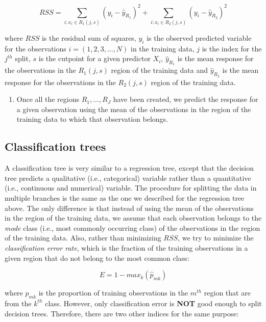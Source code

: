 \documentclass[
]{book}
\providecommand{\tightlist}{%
  \setlength{\itemsep}{0pt}\setlength{\parskip}{0pt}}
\begin{document}
\[
RSS=\sum_{i: x_i \in R_1(j,s)}(y_i-\hat{y}_{R_1})^2 + \sum_{i: x_i \in R_2(j,s)}(y_i-\hat{y}_{R_2})^2
\]

where \(RSS\) is the residual sum of squares, \(y_i\) is the observed predicted variable for the observations \(i=(1,2,3, \dots, N)\) in the training data, \(j\) is the index for the \(j^{th}\) split, \(s\) is the cutpoint for a given predictor \(X_i\), \(\hat{y}_{R_1}\) is the mean response for the observations in the \(R_1(j,s)\) region of the training data and \(\hat{y}_{R_2}\) is the mean response for the observations in the \(R_2(j,s)\) region of the training data.

\begin{enumerate}
\def\labelenumi{\arabic{enumi}.}
\setcounter{enumi}{1}
\tightlist
\item
  Once all the regions \(R_1, \dots, R_J\) have been created, we predict the response for a given observation using the mean of the observations in the region of the training data to which that observation belongs.
\end{enumerate}

\hypertarget{classification-trees}{%
\subsection{Classification trees}\label{classification-trees}}

A classification tree is very similar to a regression tree, except that the decision tree predicts a qualitative (i.e., categorical) variable rather than a quantitative (i.e., continuous and numerical) variable. The procedure for splitting the data in multiple branches is the same as the one we described for the regression tree above. The only difference is that instead of using the mean of the observations in the region of the training data, we assume that each observation belongs to the \emph{mode} class (i.e., most commonly occurring class) of the observations in the region of the training data. Also, rather than minimizing \(RSS\), we try to minimize the \emph{classification error rate}, which is the fraction of the training observations in a given region that do not belong to the most common class:

\[
E = 1 - max_k(\hat{p}_{mk})
\]

where \(\hat{p}_{mk}\) is the proportion of training observations in the \(m^{th}\) region that are from the \(k^{th}\) class. However, only classification error is \textbf{NOT} good enough to split decision trees. Therefore, there are two other indices for the same purpose:
\end{document}
